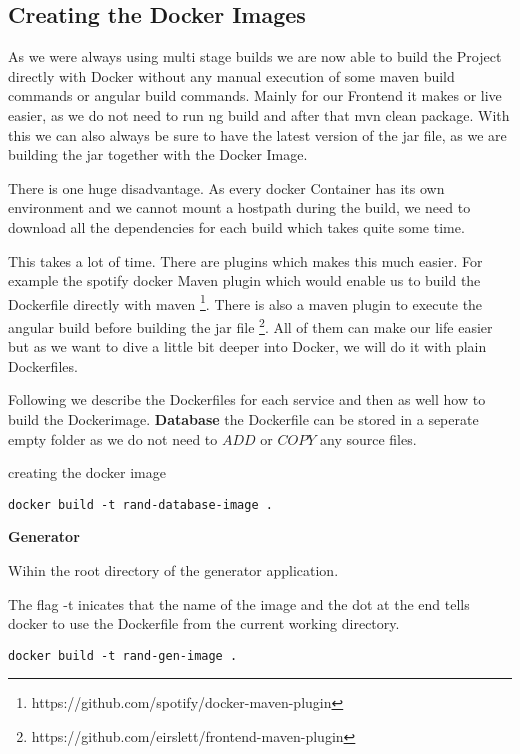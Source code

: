 \subsection{Creating the Docker Images}
As we were always using multi stage builds we are now able to build the Project directly with Docker without any manual execution of some maven build commands or angular build commands.
Mainly for our Frontend it makes or live easier, as we do not need to run ng build and after that mvn clean package.
With this we can also always be sure to have the latest version of the jar file, as we are building the jar together with the Docker Image.

There is one huge disadvantage. As every docker Container has its own environment and we cannot mount a hostpath during the build, we need to download all the dependencies for each build which takes quite some time.

This takes a lot of time. There are plugins which makes this much easier.
For example the spotify docker Maven plugin which would enable us to build the Dockerfile directly with maven \footnote{https://github.com/spotify/docker-maven-plugin}.
There is also a maven plugin to execute the angular build before building the jar file \footnote{https://github.com/eirslett/frontend-maven-plugin}.
All of them can make our life easier but as we want to dive a little bit deeper into Docker, we will do it with plain Dockerfiles.

Following we describe the Dockerfiles for each service and then as well how to build the Dockerimage.
\textbf{Database}
the Dockerfile can be stored in a seperate empty folder as we do not need to $ADD$ or $COPY$ any source files.



creating the docker image
\begin{verbatim}
docker build -t rand-database-image .
\end{verbatim}
\newpage

\textbf{Generator}

Wihin the root directory of the generator application.


The flag -t inicates that the name of the image and the dot at the end tells docker to use the Dockerfile from the current working directory.

\begin{verbatim}
docker build -t rand-gen-image .
\end{verbatim}

